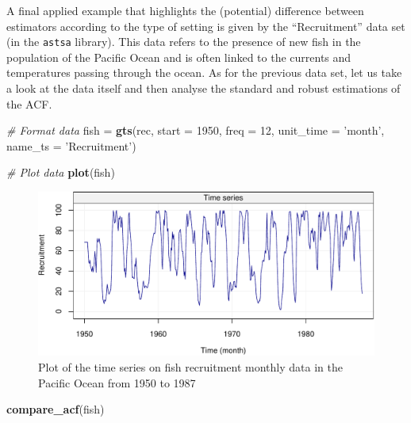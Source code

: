 \documentclass[]{book}
\newenvironment{Shaded}{\begin{snugshade}}{\end{snugshade}}
\newcommand{\CommentTok}[1]{\textcolor[rgb]{0.56,0.35,0.01}{\textit{#1}}}
\newcommand{\DataTypeTok}[1]{\textcolor[rgb]{0.13,0.29,0.53}{#1}}
\newcommand{\DecValTok}[1]{\textcolor[rgb]{0.00,0.00,0.81}{#1}}
\newcommand{\KeywordTok}[1]{\textcolor[rgb]{0.13,0.29,0.53}{\textbf{#1}}}
\newcommand{\NormalTok}[1]{#1}
\newcommand{\StringTok}[1]{\textcolor[rgb]{0.31,0.60,0.02}{#1}}
\theoremstyle{definition}
\theoremstyle{definition}
\theoremstyle{definition}
\theoremstyle{remark}
\begin{document}
A final applied example that highlights the (potential) difference
between estimators according to the type of setting is given by the
``Recruitment'' data set (in the \texttt{astsa} library). This data
refers to the presence of new fish in the population of the Pacific
Ocean and is often linked to the currents and temperatures passing
through the ocean. As for the previous data set, let us take a look at
the data itself and then analyse the standard and robust estimations of
the ACF.

\begin{Shaded}
\begin{Highlighting}[]
\CommentTok{# Format data}
\NormalTok{fish =}\StringTok{ }\KeywordTok{gts}\NormalTok{(rec, }\DataTypeTok{start =} \DecValTok{1950}\NormalTok{, }\DataTypeTok{freq =} \DecValTok{12}\NormalTok{, }\DataTypeTok{unit_time =} \StringTok{'month'}\NormalTok{, }\DataTypeTok{name_ts =} \StringTok{'Recruitment'}\NormalTok{)}

\CommentTok{# Plot data}
\KeywordTok{plot}\NormalTok{(fish)}
\end{Highlighting}
\end{Shaded}

\begin{figure}

{\centering \includegraphics{ts_files/figure-latex/unnamed-chunk-35-1} 

}

\caption{Plot of the time series on fish recruitment monthly data in the Pacific Ocean from 1950 to 1987}\label{fig:unnamed-chunk-35}
\end{figure}

\begin{Shaded}
\begin{Highlighting}[]
\KeywordTok{compare_acf}\NormalTok{(fish)}
\end{Highlighting}
\end{Shaded}
\end{document}
